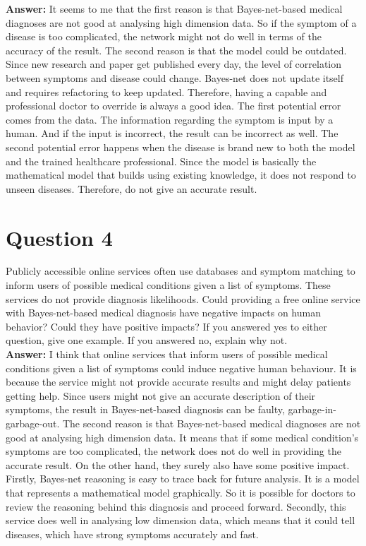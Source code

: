 \documentclass[12pt]{article}
\begin{document}
\noindent\textbf{Answer:}
It seems to me that the first reason is that Bayes-net-based medical diagnoses are not good at analysing high dimension data. So if the symptom of a disease is too complicated, the network might not do well in terms of the accuracy of the result. The second reason is that the model could be outdated. Since new research and paper get published every day, the level of correlation between symptoms and disease could change. Bayes-net does not update itself and requires refactoring to keep updated. Therefore, having a capable and professional doctor to override is always a good idea. The first potential error comes from the data. The information regarding the symptom is input by a human. And if the input is incorrect, the result can be incorrect as well. The second potential error happens when the disease is brand new to both the model and the trained healthcare professional. Since the model is basically the mathematical model that builds using existing knowledge, it does not respond to unseen diseases. Therefore, do not give an accurate result.

\newpage

\section*{Question 4} Publicly accessible online services often use databases and 
symptom matching to inform users of possible medical conditions given a list of 
symptoms. These services do not provide diagnosis likelihoods. Could providing a 
free online service with Bayes-net-based medical diagnosis have negative impacts on
human behavior? Could they have positive impacts? If you answered yes to either 
question, give one example. If you answered no, explain why not. \\

\noindent\textbf{Answer:}
I think that online services that inform users of possible medical conditions given a list of symptoms could induce negative human behaviour. It is because the service might not provide accurate results and might delay patients getting help. Since users might not give an accurate description of their symptoms, the result in Bayes-net-based diagnosis can be faulty, garbage-in-garbage-out. The second reason is that Bayes-net-based medical diagnoses are not good at analysing high dimension data. It means that if some medical condition’s symptoms are too complicated, the network does not do well in providing the accurate result. On the other hand, they surely also have some positive impact. Firstly, Bayes-net reasoning is easy to trace back for future analysis. It is a model that represents a mathematical model graphically. So it is possible for doctors to review the reasoning behind this diagnosis and proceed forward. Secondly, this service does well in analysing low dimension data, which means that it could tell diseases, which have strong symptoms accurately and fast. 
\end{document}
